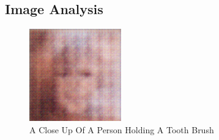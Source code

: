 \documentclass{article}%
\begin{document}
%
\subsection{Image Analysis}%
\label{subsec:ImageAnalysis}%


\begin{figure}[h!]%
\centering%
\includegraphics[width=150px]{500_fake_images/samples_5_308.png}%
\caption{A Close Up Of A Person Holding A Tooth Brush}%
\end{figure}

%
\end{document}
